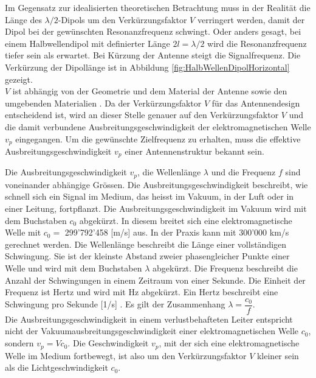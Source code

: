 Im Gegensatz zur idealisierten theoretischen Betrachtung muss in der Realität die Länge des $\lambda /2$-Dipols um den Verkürzungsfaktor $V$ verringert werden, damit der Dipol bei der gewünschten Resonanzfrequenz schwingt. Oder anders gesagt, bei einem Halbwellendipol mit definierter Länge $2l=\lambda/2$ wird die Resonanzfrequenz tiefer sein als erwartet. Bei Kürzung der Antenne steigt die Signalfrequenz. Die Verkürzung der Dipollänge ist in Abbildung \ref{fig:HalbWellenDipolHorizontal} gezeigt. \\
$V$ ist abhängig von der Geometrie und dem Material der Antenne sowie den umgebenden Materialien \cite{Hcuno}. Da der Verkürzungsfaktor $V$ für das Antennendesign entscheidend ist,  wird an dieser Stelle genauer auf den Verkürzungsfaktor $V$ und die damit verbundene Ausbreitungsgeschwindigkeit der elektromagnetischen Welle $v_p$ eingegangen. Um die gewünschte Zielfrequenz zu erhalten, muss die effektive Ausbreitungsgeschwindigkeit $v_p$ einer Antennenstruktur bekannt sein.

\newpage
Die Ausbreitungsgeschwindigkeit $v_p$, die Wellenlänge $\lambda$ und die Frequenz $f$ sind voneinander abhängige Grössen. Die Ausbreitungsgeschwindigkeit beschreibt, wie schnell sich ein Signal im Medium, das heisst im Vakuum, in der Luft oder in einer Leitung, fortpflanzt. Die Ausbreitungsgeschwindigkeit im Vakuum wird mit dem Buchstaben $c_0$ abgekürzt. In diesem breitet sich eine elektromagnetische Welle mit $c_0 = $ 299'792’458 [m/s] aus. In der Praxis kann mit 300'000 km/s gerechnet werden. Die Wellenlänge beschreibt die Länge einer vollständigen Schwingung. Sie ist der kleinste Abstand zweier phasengleicher Punkte einer Welle und wird mit dem Buchstaben $\lambda$ abgekürzt. Die Frequenz beschreibt die Anzahl der Schwingungen in einem Zeitraum von einer Sekunde. Die Einheit der Frequenz ist Hertz und wird mit Hz abgekürzt. Ein Hertz beschreibt eine Schwingung pro Sekunde [1/s] \cite{Verkuertzungsfaktor}.
Es gilt der Zusammenhang $\lambda = \dfrac{c_0}{f}$. \\
Die Ausbreitungsgeschwindigkeit in einem verlustbehafteten Leiter entspricht nicht der Vakuumausbreitungsgeschwindigkeit einer elektromagnetischen Welle $c_0$, sondern $v_p=V c_0$. Die Geschwindigkeit $v_p$, mit der sich eine elektromagnetische Welle im Medium fortbewegt, ist also um den Verkürzungsfaktor $V$ kleiner sein als die Lichtgeschwindigkeit $c_0$.\\ 

